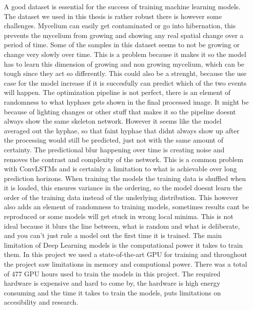 \documentclass[a4paper,12pt]{article}
\begin{document}
A good dataset is essential for the success of training machine learning models. The dataset we used in this thesis is rather robust there is however some challenges. Mycelium can easily get contaminated or go into hibernation, this prevents the mycelium from growing and showing any real spatial change over a period of time. Some of the samples in this dataset seems to not be growing or change very slowly over time. This is a problem because it makes it so the model has to learn this dimension of growing and non growing mycelium, which can be tough since they act so differently. This could also be a strenght, because the use case for the model increase if it is succesfully can predict which of the two events will happen.
The optimization pipeline is not perfect, there is an element of randomness to what hyphaes gets shown in the final processed image. It might be because of lighting changes or other stuff that makes it so the pipeline doesnt always show the same skeleton network. However it seems like the model averaged out the hyphae, so that faint hyphae that didnt always show up after the processing would still be predicted, just not with the same amount of certainty.
The predictional blur happening over time is creating noise and removes the contrast and complexity of the network. This is a common problem with ConvLSTMs and is certainly a limitation to what is achievable over long prediction horizons. When training the models the training data is shuffled when it is loaded, this ensures variance in the ordering, so the model doesnt learn the order of the training data instead of the underlying distribution. This however also adds an element of randomness to training models, sometimes results cant be reproduced or some models will get stuck in wrong local minima. This is not ideal because it blurs the line between, what is random and what is deliberate, and you can't just rule a model out the first time it is trained.
The main limitation of Deep Learning models is the computational power it takes to train them. In this project we used a state-of-the-art GPU for training and throughout the project saw limitations in memory and computional power. There was a total of 477 GPU hours used to train the models in this project. The required hardware is expensive and hard to come by, the hardware is high energy consuming and the time it takes to train the models, puts limitations on accesibility and research.
\end{document}
